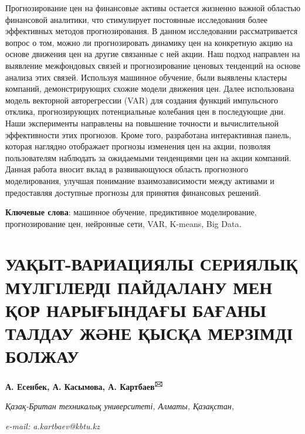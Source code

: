 \documentclass[
]{article}
\begin{document}
Прогнозирование цен на финансовые активы остается жизненно важной
областью финансовой аналитики, что стимулирует постоянные исследования
более эффективных методов прогнозирования. В данном исследовании
рассматривается вопрос о том, можно ли прогнозировать динамику цен на
конкретную акцию на основе движения цен на другие связанные с ней акции.
Наш подход направлен на выявление межфондовых связей и прогнозирование
ценовых тенденций на основе анализа этих связей. Используя машинное
обучение, были выявлены кластеры компаний, демонстрирующих схожие модели
движения цен. Далее использована модель векторной авторегрессии (VAR)
для создания функций импульсного отклика, прогнозирующих потенциальные
колебания цен в последующие дни. Наши эксперименты направлены на
повышение точности и вычислительной эффективности этих прогнозов. Кроме
того, разработана интерактивная панель, которая наглядно отображает
прогнозы изменения цен на акции, позволяя пользователям наблюдать за
ожидаемыми тенденциями цен на акции компаний. Данная работа вносит вклад
в развивающуюся область прогнозного моделирования, улучшая понимание
взаимозависимости между активами и предоставляя доступные прогнозы для
принятия финансовых решений.

\textbf{Ключевые слова}: машинное обучение, предиктивное моделирование,
прогнозирование цен, нейронные сети, VAR, K-means, Big Data\emph{.}

\section{\texorpdfstring{\textbf{УАҚЫТ-ВАРИАЦИЯЛЫ СЕРИЯЛЫҚ МҮЛГІЛЕРДІ
ПАЙДАЛАНУ МЕН ҚОР НАРЫҒЫНДАҒЫ БАҒАНЫ ТАЛДАУ ЖӘНЕ ҚЫСҚА МЕРЗІМДІ
БОЛЖАУ}}{УАҚЫТ-ВАРИАЦИЯЛЫ СЕРИЯЛЫҚ МҮЛГІЛЕРДІ ПАЙДАЛАНУ МЕН ҚОР НАРЫҒЫНДАҒЫ БАҒАНЫ ТАЛДАУ ЖӘНЕ ҚЫСҚА МЕРЗІМДІ БОЛЖАУ}}\label{ux443ux430ux49bux44bux442-ux432ux430ux440ux438ux430ux446ux438ux44fux43bux44b-ux441ux435ux440ux438ux44fux43bux44bux49b-ux43cux4afux43bux433ux456ux43bux435ux440ux434ux456-ux43fux430ux439ux434ux430ux43bux430ux43dux443-ux43cux435ux43d-ux49bux43eux440-ux43dux430ux440ux44bux493ux44bux43dux434ux430ux493ux44b-ux431ux430ux493ux430ux43dux44b-ux442ux430ux43bux434ux430ux443-ux436ux4d9ux43dux435-ux49bux44bux441ux49bux430-ux43cux435ux440ux437ux456ux43cux434ux456-ux431ux43eux43bux436ux430ux443}

\textbf{А. Есенбек, А. Касымова, А. Картбаев\textsuperscript{🖂}}

\emph{Қазақ-Британ техникалық университеті, Алматы, Қазақстан,}

\emph{e-mail: a.kartbaev@kbtu.kz}
\end{document}
